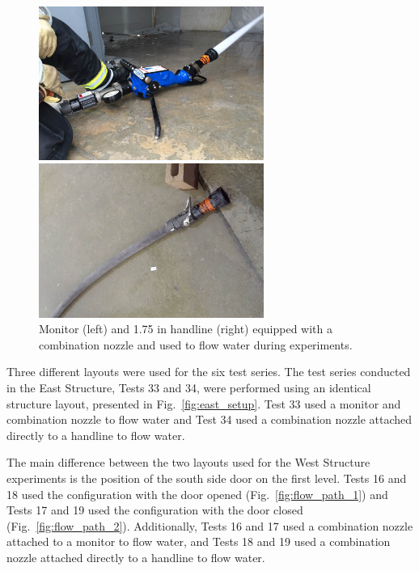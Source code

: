 \documentclass[12pt,oneside]{book}
\begin{document}
\begin{figure}[!ht]
	\minipage{3in}
	\begin{center}
		\includegraphics[width=2.9in]{../Figures/Pictures/monitor}
	\end{center} 
	\endminipage \hfill
	\minipage{3in}
	\begin{center}
		\includegraphics[width=2.9in]{../Figures/Pictures/handline}
	\end{center}
	\endminipage \hfill
	\caption[Monitor and handline equipped with a combination nozzle.]{Monitor (left) and 1.75 in handline (right) equipped with a combination nozzle and used to flow water during experiments.}
	\label{fig:monitor+handline}
\end{figure}
\FloatBarrier

Three different layouts were used for the six test series. The test series conducted in the East Structure, Tests 33 and 34, were performed using an identical structure layout, presented in Fig.~\ref{fig:east_setup}. Test 33 used a monitor and combination nozzle to flow water and Test 34 used a combination nozzle attached directly to a handline to flow water.

The main difference between the two layouts used for the West Structure experiments is the position of the south side door on the first level. Tests 16 and 18 used the configuration with the door opened (Fig.~\ref{fig:flow_path_1}) and Tests 17 and 19 used the configuration with the door closed (Fig.~\ref{fig:flow_path_2}). Additionally, Tests 16 and 17 used a combination nozzle attached to a monitor to flow water, and Tests 18 and 19 used a combination nozzle attached directly to a handline to flow water.
\end{document}
